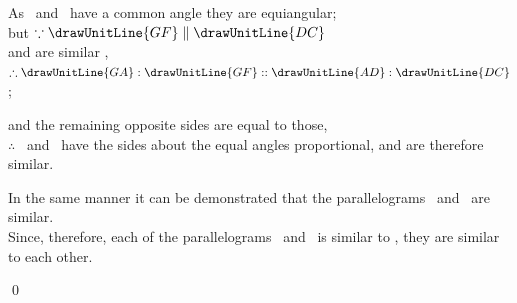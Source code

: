 \documentclass[booklanguage=english]{byrnebook}
\begin{document}
\begin{center}
As \parallelogramABCD\ and \parallelogramAEFG\ have a common angle they are equiangular;\\
but $\because \drawUnitLine{GF} \parallel \drawUnitLine{DC}$\\ %
and
are similar ,\\
$\therefore \drawUnitLine{GA} : \drawUnitLine{GF} :: \drawUnitLine{AD} : \drawUnitLine{DC}$;

and the remaining opposite sides are equal to those,\\
$\therefore$ \parallelogramAEFG\ and \parallelogramABCD\ have the sides about the equal angles proportional, and are therefore similar.

In the same manner it can be demonstrated that the parallelograms \parallelogramABCD\ and \parallelogramFHCK\ are similar.\\
Since, therefore, each of the parallelograms \parallelogramAEFG\ and \parallelogramFHCK\ is similar to \parallelogramABCD, they are similar to each other.
\end{center}

\qed
\end{document}
